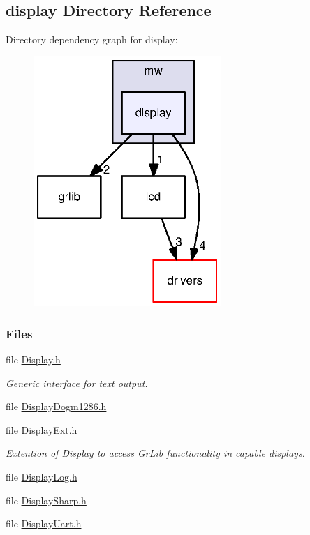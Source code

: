 \subsection{display Directory Reference}
\label{dir_aa38a108c49855a9f9e08775482d153b}
Directory dependency graph for display\+:
\nopagebreak
\begin{figure}[H]
\begin{center}
\leavevmode
\includegraphics[width=201pt]{dir_aa38a108c49855a9f9e08775482d153b_dep}
\end{center}
\end{figure}
\subsubsection*{Files}
\begin{DoxyCompactItemize}
\item 
file \hyperlink{_display_8h}{Display.\+h}
\begin{DoxyCompactList}\small\item\em Generic interface for text output. \end{DoxyCompactList}\item 
file \hyperlink{_display_dogm1286_8h}{Display\+Dogm1286.\+h}
\item 
file \hyperlink{_display_ext_8h}{Display\+Ext.\+h}
\begin{DoxyCompactList}\small\item\em Extention of Display to access Gr\+Lib functionality in capable displays. \end{DoxyCompactList}\item 
file \hyperlink{_display_log_8h}{Display\+Log.\+h}
\item 
file \hyperlink{_display_sharp_8h}{Display\+Sharp.\+h}
\item 
file \hyperlink{_display_uart_8h}{Display\+Uart.\+h}
\end{DoxyCompactItemize}

